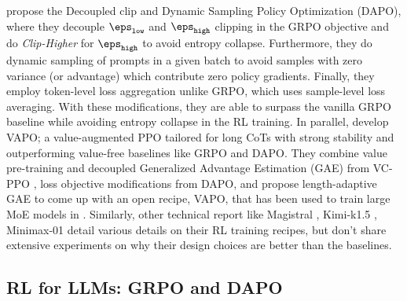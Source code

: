 \citet{yu2025dapo} propose the Decoupled clip and Dynamic Sampling Policy Optimization (DAPO), where they decouple $\eps_{\texttt{low}}$ and $\eps_{\texttt{high}}$ clipping in the GRPO objective and do \textit{Clip-Higher} for $\eps_{\texttt{high}}$ to avoid entropy collapse. Furthermore, they do dynamic sampling of prompts in a given batch to avoid samples with zero variance (or advantage) which contribute zero policy gradients. Finally, they employ token-level loss aggregation unlike GRPO, which uses sample-level loss averaging. With these modifications, they are able to surpass the vanilla GRPO baseline while avoiding entropy collapse in the RL training. In parallel, \citet{yue2025vapo} develop VAPO; a value-augmented PPO tailored for long CoTs with strong stability and outperforming value-free baselines like GRPO and DAPO. They combine value pre-training and decoupled Generalized Advantage Estimation (GAE) from VC-PPO \citep{yuan2025s}, loss objective modifications from DAPO, and propose length-adaptive GAE to come up with an open recipe, VAPO, that has been used to train large MoE models in \citet{seed2025seed1}. Similarly, other technical report like Magistral \citep{rastogi2025magistral}, Kimi-k1.5 \citep{team2025kimi}, Minimax-01 \citep{li2025minimax} detail various details on their RL training recipes, but don't share extensive experiments on why their design choices are better than the baselines.

\subsection{RL for LLMs: GRPO and DAPO}\label{appendix:background}

